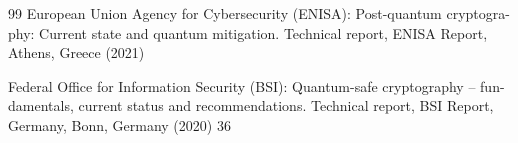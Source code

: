 \documentclass[5p,times]{elsarticle}
\begin{document}
\begin{thebibliography}{99}
European Union Agency for Cybersecurity (ENISA): Post-quantum cryptogra- phy: Current state and quantum mitigation. Technical report, ENISA Report, Athens, Greece (2021)

Federal Office for Information Security (BSI): Quantum-safe cryptography -- fun- damentals, current status and recommendations. Technical report, BSI Report, Germany, Bonn, Germany (2020) 36

\end{thebibliography}
\end{document}
